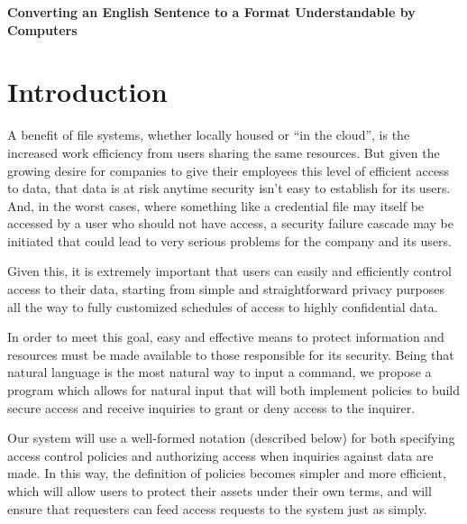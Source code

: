 \documentclass[12pt]{article}
\begin{document}

\begin{center}
\textbf{Converting an English Sentence to a Format Understandable by Computers}
\end{center}

\section{Introduction}
A benefit of file systems, whether locally housed or “in the cloud”, is the increased work efficiency from users sharing the same resources. But given the growing desire for companies to give their employees this level of efficient access to data, that data is at risk anytime security isn’t easy to establish for its users. And, in the worst cases, where something like a credential file may itself be accessed by a user who should not have access, a security failure cascade may be initiated that could lead to very serious problems for the company and its users.

Given this, it is extremely important that users can easily and efficiently control access to their data, starting from simple and straightforward privacy purposes all the way to fully customized schedules of access to highly confidential data.

In order to meet this goal, easy and effective means to protect information and resources must be made available to those responsible for its security. 
Being that natural language is the most natural way to input a command, we propose a program which allows for natural input that will both implement policies to build secure access and receive inquiries to grant or deny access to the inquirer.

Our system will use a well-formed notation (described below) for both specifying access control policies and authorizing access when inquiries against data are made. In this way, the definition of policies becomes simpler and more efficient, which will allow users to protect their assets under their own terms, and will ensure that requesters can feed access requests to the system just as simply.
\end{document}
